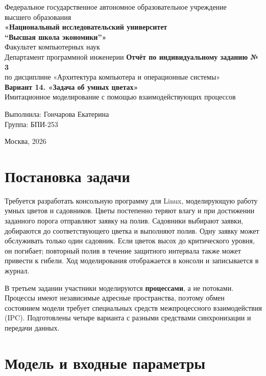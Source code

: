 \documentclass[12pt,a4paper]{article}
\begin{document}
\begin{titlepage}
\begin{center}
Федеральное государственное автономное образовательное учреждение\\
высшего образования\\[2mm]
\textbf{«Национальный исследовательский университет\\
``Высшая школа экономики''»}\\[3mm]
Факультет компьютерных наук\\
Департамент программной инженерии
\vfill
{\Large\bfseries Отчёт по индивидуальному заданию № 3}\\[4mm]
{\large по дисциплине «Архитектура компьютера и операционные системы»}\\[7mm]
{\Large\bfseries Вариант 14. «Задача об умных цветах»}\\[3mm]
{\large Имитационное моделирование с помощью взаимодействующих процессов}
\vfill
\begin{flushright}
Выполнила: Гончарова Екатерина\\
Группа: БПИ-253
\end{flushright}
\vfill
Москва, 2026
\end{center}
\end{titlepage}
\tableofcontents
\newpage

\section{Постановка задачи}
Требуется разработать консольную программу для Linux, моделирующую работу умных цветов и садовников. Цветы постепенно теряют влагу и при достижении заданного порога отправляют заявку на полив. Садовники выбирают заявки, добираются до соответствующего цветка и выполняют полив. Одну заявку может обслуживать только один садовник. Если цветок высох до критического уровня, он погибает; повторный полив в течение защитного интервала также может привести к гибели. Ход моделирования отображается в консоли и записывается в журнал.

В третьем задании участники моделируются \textbf{процессами}, а не потоками. Процессы имеют независимые адресные пространства, поэтому обмен состоянием модели требует специальных средств межпроцессного взаимодействия (IPC). Подготовлены четыре варианта с разными средствами синхронизации и передачи данных.

\section{Модель и входные параметры}
\end{document}
